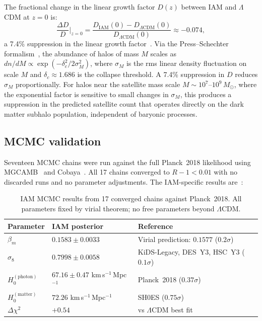 \documentclass[12pt,a4paper]{article}
\begin{document}
The fractional change in the linear growth factor $D(z)$ between IAM and
$\Lambda$CDM at $z = 0$ is:
\begin{equation}
\frac{\Delta D}{D}\bigg|_{z=0}
= \frac{D_\mathrm{IAM}(0) - D_{\Lambda\mathrm{CDM}}(0)}
       {D_{\Lambda\mathrm{CDM}}(0)} \approx -0.074,
\label{eq:growth}
\end{equation}
a 7.4\% suppression in the linear growth factor~\citep{IAM_obs}. Via the
Press--Schechter formalism~\citep{PressSchechter1974}, the abundance of halos
of mass $M$ scales as $dn/dM \propto \exp(-\delta_c^2/2\sigma_M^2)$, where
$\sigma_M$ is the rms linear density fluctuation on scale $M$ and $\delta_c
\approx 1.686$ is the collapse threshold. A 7.4\% suppression in $D$ reduces
$\sigma_M$ proportionally. For halos near the satellite mass scale
$M \sim 10^7$--$10^9\,M_\odot$, where the exponential factor is sensitive
to small changes in $\sigma_M$, this produces a suppression in the predicted
satellite count that operates directly on the dark matter subhalo population,
independent of baryonic processes.

\subsection{MCMC validation}

Seventeen MCMC chains were run against the full Planck~2018 likelihood
\citep{PlanckVI2020} using MGCAMB~\citep{Hojjati2011} and
Cobaya~\citep{Torrado2021}. All 17 chains converged to $R-1 < 0.01$ with no
discarded runs and no parameter adjustments. The IAM-specific results
are~\citep{IAM_obs}:

\begin{table}[H]
\centering
\small
\caption{IAM MCMC results from 17 converged chains against Planck~2018.
All parameters fixed by virial theorem; no free parameters beyond
$\Lambda$CDM.}
\label{tab:mcmc}
\begin{tabular}{lll}
\toprule
Parameter & IAM posterior & Reference \\
\midrule
$\beta_m$ & $0.1583 \pm 0.0033$ & Virial prediction: $0.1577$ ($0.2\sigma$) \\
$\sigma_8$ & $0.7998 \pm 0.0058$ & KiDS-Legacy, DES~Y3, HSC~Y3 ($0.1\sigma$) \\
$H_0^\mathrm{(photon)}$ & $67.16 \pm 0.47$ km\,s$^{-1}$\,Mpc$^{-1}$ & Planck~2018 ($0.37\sigma$) \\
$H_0^\mathrm{(matter)}$ & $72.26$ km\,s$^{-1}$\,Mpc$^{-1}$ & SH0ES ($0.75\sigma$) \\
$\Delta\chi^2$ & $+0.54$ & vs $\Lambda$CDM best fit \\
\bottomrule
\end{tabular}
\end{table}
\end{document}
